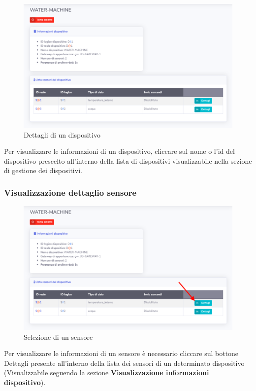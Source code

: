 		\begin{figure}[H]
		\centering
		\includegraphics[scale=0.600]{res/images/admin/dettDisp.png}
		\caption{Dettagli di un dispositivo}
	\end{figure}


		Per visualizzare le informazioni di un dispositivo, cliccare sul nome o l'id del dispositivo prescelto all'interno della lista di dispositivi visualizzabile nella sezione di gestione dei dispositivi.

	\subsubsection{Visualizzazione dettaglio sensore}

		\begin{figure}[H]
		\centering
		\includegraphics[scale=0.600]{res/images/admin/selDettSens.png}
		\caption{Selezione di un sensore}
	\end{figure}


		Per visualizzare le informazioni di un sensore è necessario cliccare sul bottone Dettagli presente all'interno della lista dei sensori di un determinato dispositivo (Visualizzabile seguendo la sezione \textbf{Visualizzazione informazioni dispositivo}).

